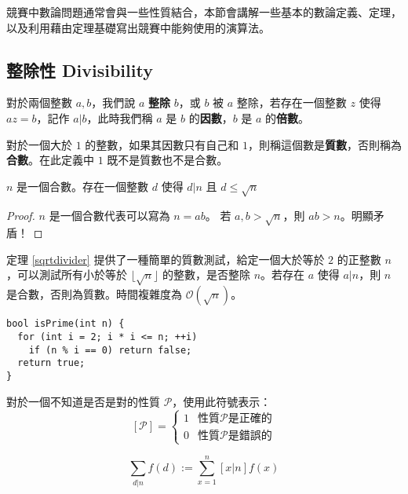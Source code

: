 競賽中數論問題通常會與一些性質結合，本節會講解一些基本的數論定義、定理，以及利用藉由定理基礎寫出競賽中能夠使用的演算法。


\subsection{整除性 Divisibility}
\label{sec:div:div}

\begin{definition}
對於兩個整數 $a,b$，我們說 $a$ \textbf{整除} $b$，或 $b$ 被 $a$ 整除，若存在一個整數 $z$ 使得 $az=b$，記作 $a|b$，此時我們稱 $a$ 是 $b$ 的\textbf{因數}，$b$ 是 $a$ 的\textbf{倍數}。
\end{definition}

\begin{definition}
對於一個大於 $1$ 的整數，如果其因數只有自己和 $1$，則稱這個數是\textbf{質數}，否則稱為\textbf{合數}。在此定義中 $1$ 既不是質數也不是合數。
\end{definition}

\begin{theorem}
\label{sqrtdivider}
$n$ 是一個合數。存在一個整數 $d$ 使得 $d|n$ 且 $d\leq\sqrt n$
\end{theorem}
\begin{proof}
$n$ 是一個合數代表可以寫為 $n=ab$。
若 $a,b>\sqrt n$，則 $ab>n$。明顯矛盾！
\end{proof}

定理 \ref{sqrtdivider} 提供了一種簡單的質數測試，給定一個大於等於 $2$ 的正整數 $n$，可以測試所有小於等於 $\lfloor\sqrt n\rfloor$ 的整數，是否整除 $n$。若存在 $a$ 使得 $a|n$，則 $n$ 是合數，否則為質數。時間複雜度為 $\mathcal{O}(\sqrt n)$。

\begin{lstlisting}[caption=樸素的質數測試]
bool isPrime(int n) {
  for (int i = 2; i * i <= n; ++i)
    if (n % i == 0) return false;
  return true; 
}
\end{lstlisting}

\begin{definition}
對於一個不知道是否是對的性質 $\mathcal{P}$，使用此符號表示：
$$\left[\mathcal{P}\right]=
\begin{cases}
1 & {\textsf{性質}\mathcal{P}\textsf{是正確的}}\\
0 & {\textsf{性質}\mathcal{P}\textsf{是錯誤的}}
\end{cases}
$$
\end{definition}

\begin{definition}
$$\sum_{d|n} f\left(d\right):=\sum_{x=1}^n \left[x|n\right]f(x)$$
\end{definition}

